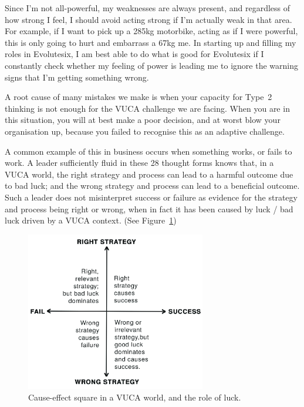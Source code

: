 Since I'm not all-powerful, my weaknesses are always present, and regardless of how strong I feel, I should avoid acting strong if I'm actually weak in that area. For example, if I want to pick up a 285kg motorbike, acting as if I were powerful, this is only going to hurt and embarrass a 67kg me. In starting up and filling my roles in Evolutesix, I am best able to do what is good for Evolutesix if I constantly check whether my feeling of power is leading me to ignore the warning signs that I'm getting something wrong. 


A root cause of many mistakes we make is when your capacity for Type~2 thinking is not enough for the VUCA challenge we are facing. When you are in this situation, you will at best make a poor decision, and at worst blow your organisation up, because you failed to recognise this as an adaptive challenge.


A common example of this in business occurs when something works, or fails to work. A leader sufficiently fluid in these 28 thought forms knows that, in a VUCA  world, the right strategy and process can lead to a harmful outcome due to bad luck; and the wrong strategy and process can lead to a beneficial outcome. Such a leader does not misinterpret success or failure as evidence for the strategy and process being right or wrong, when in fact it has been caused by luck / bad luck driven by a VUCA context\cite{ormerod-why-fail, edmondson-fearless}. (See Figure~\ref{figure:vuca-luck})


\begin{figure}
\begin{center}\includegraphics[width=0.70\textwidth]{./Images/Vuca-Cause-and-Effect}\end{center}
\caption{Cause-effect square in a VUCA world, and the role of luck.}
\label{figure:vuca-luck}
\end{figure}


